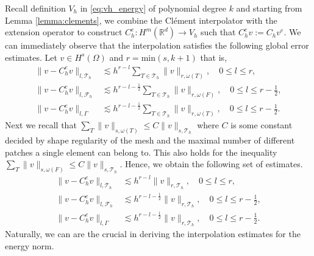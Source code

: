 Recall definition $V_{h}$ in \eqref{eq:vh_energy} of polynomial degree $k$ and starting from Lemma \ref{lemma:clements}, we combine the Clément interpolator with the extension operator to construct $C_{h}^{e}: H^{m}( \mathbb{R} ^{d}) \to V_{h}$ such that $C ^{e} _{h} v := C _{h} v^{e} $.
We can immediately observe that the interpolation satisfies the following global error estimates. Let $v \in H^{s}( \Omega ) $ and $r = \mathrm{min}(s , k+1) $  that is,
\begin{align}
    \| v - C _{h}^{e} v \|_{  l, \mathcal{T} _{h} }^{  } & \lesssim h^{r-l}\sum_{T \in \mathcal{T}_h} \| v \|_{ r, \omega(T) }^{  }, \quad 0\le l\le r, \\
    \| v - C ^{e}_{h}v \|_{ l,\mathcal{F} _{h} }^{  } & \lesssim h^{r-l-\frac{1}{2}}\sum_{T \in \mathcal{T}_h} \| v \|_{ r, \omega(F)  }^{  }, \quad 0  \le  l \le   r-\frac{1}{2}, \\
\| v - C ^{e}_{h}v \|_{ l, \Gamma }^{  } & \lesssim h^{r-l-\frac{1}{2}} \sum_{T \in \mathcal{T}_h}  \| v \|_{ r,  \omega(T)  }^{  }, \quad 0  \le  l \le  r-\frac{1}{2}.
\end{align}
 Next we recall that $ \sum_{T}^{} \| v \|_{s,\omega ( T)   }^{  } \le C  \| v \|_{s, \mathcal{T}_{h}   }^{  } $ where $C$ is some constant decided by shape regularity of the mesh and the maximal number of different patches a single element can
 belong to. This also holds for the inequality $ \sum_{T}^{} \| v \|_{s,\omega ( F)   }^{  } \le C  \| v \|_{s, \mathcal{T}_{h}   }^{  } $. Hence, we obtain the following set of estimates.
\begin{align}
    \label{eq:bi_projection_estimates_1}
    \| v - C _{h}^{e} v \|_{  l, \mathcal{T} _{h} }^{  } & \lesssim h^{r-l} \| v \|_{ r, \mathcal{T} _{h} }^{  }, \quad 0\le l\le r, \\
    \label{eq:bi_projection_estimates_2}
    \| v - C ^{e}_{h}v \|_{ l,\mathcal{F} _{h} }^{  } & \lesssim h^{r-l-\frac{1}{2}} \| v \|_{ r, \mathcal{T} _{h}  }^{  }, \quad 0  \le  l \le   r-\frac{1}{2}, \\
    \label{eq:bi_projection_estimates_3}
\| v - C ^{e}_{h}v \|_{ l, \Gamma }^{  } & \lesssim h^{r-l-\frac{1}{2}}   \| v \|_{ r,  \mathcal{T} _{h}  }^{  }, \quad 0  \le  l \le  r-\frac{1}{2}.
\end{align}
Naturally, we can are the crucial in deriving the interpolation estimates for the energy norm.

